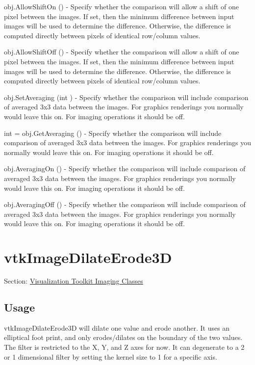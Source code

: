 \begin{DoxyItemize}
\item {\ttfamily obj.\-Allow\-Shift\-On ()} -\/ Specify whether the comparison will allow a shift of one pixel between the images. If set, then the minimum difference between input images will be used to determine the difference. Otherwise, the difference is computed directly between pixels of identical row/column values.  
\item {\ttfamily obj.\-Allow\-Shift\-Off ()} -\/ Specify whether the comparison will allow a shift of one pixel between the images. If set, then the minimum difference between input images will be used to determine the difference. Otherwise, the difference is computed directly between pixels of identical row/column values.  
\item {\ttfamily obj.\-Set\-Averaging (int )} -\/ Specify whether the comparison will include comparison of averaged 3x3 data between the images. For graphics renderings you normally would leave this on. For imaging operations it should be off.  
\item {\ttfamily int = obj.\-Get\-Averaging ()} -\/ Specify whether the comparison will include comparison of averaged 3x3 data between the images. For graphics renderings you normally would leave this on. For imaging operations it should be off.  
\item {\ttfamily obj.\-Averaging\-On ()} -\/ Specify whether the comparison will include comparison of averaged 3x3 data between the images. For graphics renderings you normally would leave this on. For imaging operations it should be off.  
\item {\ttfamily obj.\-Averaging\-Off ()} -\/ Specify whether the comparison will include comparison of averaged 3x3 data between the images. For graphics renderings you normally would leave this on. For imaging operations it should be off.  
\end{DoxyItemize}\hypertarget{vtkimaging_vtkimagedilateerode3d}{}\section{vtk\-Image\-Dilate\-Erode3\-D}\label{vtkimaging_vtkimagedilateerode3d}
Section\-: \hyperlink{sec_vtkimaging}{Visualization Toolkit Imaging Classes} \hypertarget{vtkwidgets_vtkxyplotwidget_Usage}{}\subsection{Usage}\label{vtkwidgets_vtkxyplotwidget_Usage}
vtk\-Image\-Dilate\-Erode3\-D will dilate one value and erode another. It uses an elliptical foot print, and only erodes/dilates on the boundary of the two values. The filter is restricted to the X, Y, and Z axes for now. It can degenerate to a 2 or 1 dimensional filter by setting the kernel size to 1 for a specific axis.

